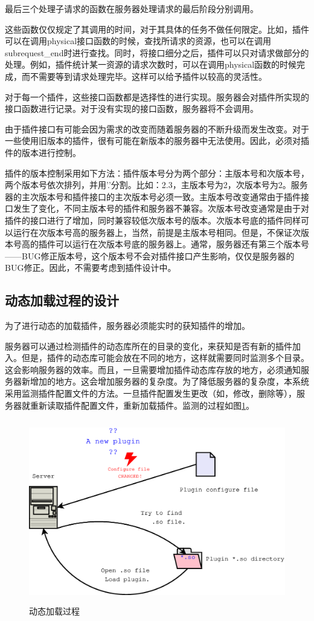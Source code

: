\documentclass[twoside, xetex]{report}
\begin{document}
	最后三个处理子请求的函数在服务器处理请求的最后阶段分别调用。
	
	这些函数仅仅规定了其调用的时间，对于其具体的任务不做任何限定。比如，插件可以在调用physical接口函数的时候，查找所请求的资源，也可以在调用subrequest\_end时进行查找。同时，将接口细分之后，插件可以只对请求做部分的处理。例如，插件统计某一资源的请求次数时，可以在调用physical函数的时候完成，而不需要等到请求处理完毕。这样可以给予插件以较高的灵活性。
	
	对于每一个插件，这些接口函数都是选择性的进行实现。服务器会对插件所实现的接口函数进行记录。对于没有实现的接口函数，服务器将不会调用。
	
	由于插件接口有可能会因为需求的改变而随着服务器的不断升级而发生改变。对于一些使用旧版本的插件，很有可能在新版本的服务器中无法使用。因此，必须对插件的版本进行控制。
	
	插件的版本控制采用如下方法：插件版本号分为两个部分：主版本号和次版本号，两个版本号依次排列，并用'.'分割。比如：2.3，主版本号为2，次版本号为2。服务器的主次版本号和插件接口的主次版本号必须一致。主版本号改变通常由于插件接口发生了变化，不同主版本号的插件和服务器不兼容。次版本号改变通常是由于对插件的接口进行了增加，同时兼容较低次版本号的版本。次版本号底的插件同样可以运行在次版本号高的服务器上，当然，前提是主版本号相同。但是，不保证次版本号高的插件可以运行在次版本号底的服务器上。通常，服务器还有第三个版本号——BUG修正版本号，这个版本号不会对插件接口产生影响，仅仅是服务器的BUG修正。因此，不需要考虑到插件设计中。
	
\subsection{动态加载过程的设计}
	为了进行动态的加载插件，服务器必须能实时的获知插件的增加。
	
	服务器可以通过检测插件的动态库所在的目录的变化，来获知是否有新的插件加入。但是，插件的动态库可能会放在不同的地方，这样就需要同时监测多个目录。这会影响服务器的效率。而且，一旦需要增加插件动态库存放的地方，必须通知服务器新增加的地方。这会增加服务器的复杂度。为了降低服务器的复杂度，本系统采用监测插件配置文件的方法。一旦插件配置发生更改（如，修改，删除等），服务器就重新读取插件配置文件，重新加载插件。监测的过程如图\ref{loadplugin}。
	\begin{figure}[htbp]
	\centering
	\includegraphics[height=8cm, width=13cm]{pics/loadplugin.eps}
	\caption{动态加载过程}
	\label{loadplugin}
	\end{figure}
	
\end{document}
